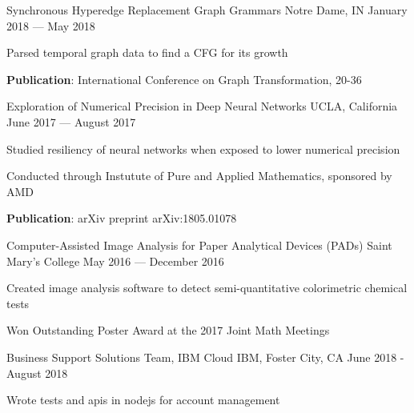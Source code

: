 \begin{cventries}
  {Synchronous Hyperedge Replacement Graph Grammars}
  {Notre Dame, IN}
  {January 2018 --- May 2018}
  {\begin{cvitems}
    \item Parsed temporal graph data to find a CFG for its growth
    \item \textbf{Publication}: International Conference on Graph Transformation, 20-36
    \end{cvitems}
  }
  {Exploration of Numerical Precision in Deep Neural Networks}
  {UCLA, California}
  {June 2017 --- August 2017}
  {\begin{cvitems}
    \item Studied resiliency of neural networks when exposed to lower numerical precision
    \item Conducted through Instutute of Pure and Applied Mathematics, sponsored by AMD
    \item \textbf{Publication}: arXiv preprint arXiv:1805.01078
    \end{cvitems}
  }
  {Computer-Assisted Image Analysis for Paper Analytical Devices (PADs)}
  {Saint Mary's College}
  {May 2016 --- December 2016}
  {\begin{cvitems}
    \item {Created image analysis software to detect semi-quantitative colorimetric chemical tests}
    \item {Won Outstanding Poster Award at the 2017 Joint Math Meetings}
    \end{cvitems}
  }
\end{cventries}

\begin{cventries}
  {Business Support Solutions Team, IBM Cloud}
  {IBM, Foster City, CA}
  {June 2018 - August 2018}
  {\begin{cvitems}
  \item Wrote tests and apis in nodejs for account management
  \end{cvitems}}
\end{cventries}

